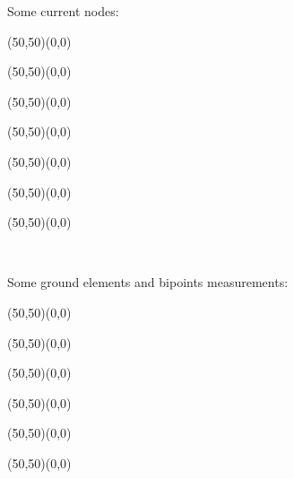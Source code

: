 	Some current nodes:
	\begin{center}
	\begin{picture}(50,50)(0,0)
	\end{picture}
	\begin{picture}(50,50)(0,0)
	\end{picture}
	\begin{picture}(50,50)(0,0)
	\end{picture}
	\begin{picture}(50,50)(0,0)
	\end{picture}
	\begin{picture}(50,50)(0,0)
	\end{picture}
	\begin{picture}(50,50)(0,0)
	\end{picture}
	\begin{picture}(50,50)(0,0)
	\end{picture}\\[2cm]
	\end{center}
	
	Some ground elements and bipoints measurements:
	\vspace{1cm}
	\begin{center}
	\begin{picture}(50,50)(0,0)
	\end{picture}
	\begin{picture}(50,50)(0,0)
	\end{picture}
	\begin{picture}(50,50)(0,0)
	\end{picture}
	\begin{picture}(50,50)(0,0)
	\end{picture}
	\begin{picture}(50,50)(0,0)
	\end{picture}
	\begin{picture}(50,50)(0,0)
	\end{picture}\\[2cm]
	\end{center}
	
